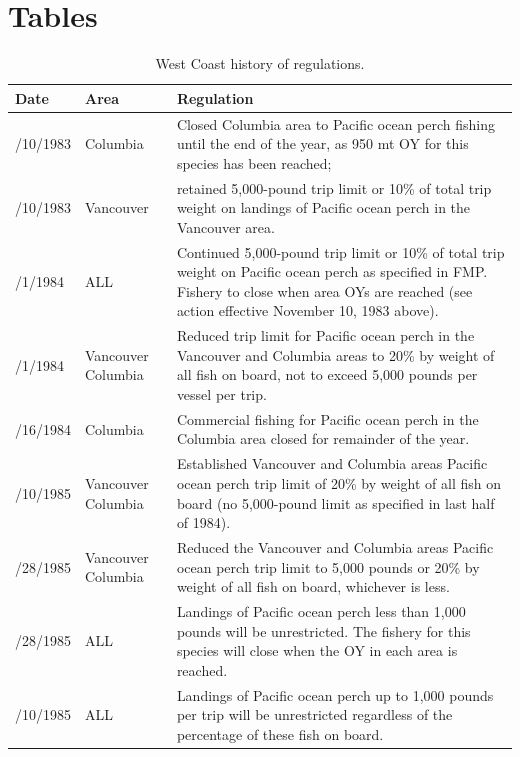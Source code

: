 \documentclass[12pt,]{article}
\begin{document}
\newpage

\FloatBarrier

\section{Tables}\label{tables}

\begin{table}[ht]
\centering
\caption{West Coast history of regulations.} 
\label{tab:Regs}
\begingroup\fontsize{9pt}{10pt}\selectfont
\begin{tabular}{>{\centering}p{.60in}>{\centering}p{1.0in}>{\raggedright}p{4.20in}}
  \hline
Date & Area & Regulation \\ 
  \hline
11/10/1983 &  Columbia  &  Closed Columbia area to Pacific ocean perch fishing until the end of the year, as 950 mt OY for this species has been reached;  \\ 
  11/10/1983 &  Vancouver  &  retained 5,000-pound trip limit or 10\% of total trip weight on landings of Pacific ocean perch in the Vancouver area.  \\ 
  1/1/1984 &  ALL  &  Continued 5,000-pound trip limit or 10\% of total trip weight on Pacific ocean perch as specified in FMP. Fishery to close when area OYs are reached (see action effective November 10, 1983 above).  \\ 
  8/1/1984 &  Vancouver Columbia  &  Reduced trip limit for Pacific ocean perch in the Vancouver and Columbia areas to 20\% by weight of all fish on board, not to exceed 5,000 pounds per vessel per trip. \\ 
  8/16/1984 &  Columbia  &  Commercial fishing for Pacific ocean perch in the Columbia area closed for remainder of the year. \\ 
  1/10/1985 &  Vancouver Columbia  &  Established Vancouver and Columbia areas Pacific ocean perch trip limit of 20\% by weight of all fish on board (no 5,000-pound limit as specified in last half of 1984). \\ 
  4/28/1985 &  Vancouver Columbia  &  Reduced the Vancouver and Columbia areas Pacific ocean perch trip limit to 5,000 pounds or 20\% by weight of all fish on board, whichever is less.  \\ 
  4/28/1985 &  ALL  &  Landings of Pacific ocean perch less than 1,000 pounds will be unrestricted. The fishery for this species will close when the OY in each area is reached. \\ 
  6/10/1985 &  ALL  &   Landings of Pacific ocean perch up to 1,000 pounds per trip will be unrestricted regardless of the percentage of these fish on board.  \\ 

\end{tabular}
\end{table}
\end{document}
